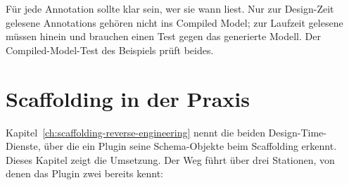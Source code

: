\begin{tip}
  Für jede Annotation sollte klar sein, wer sie wann liest. Nur zur Design-Zeit gelesene
  Annotations gehören nicht ins Compiled Model; zur Laufzeit gelesene müssen hinein und
  brauchen einen Test gegen das generierte Modell. Der Compiled-Model-Test des Beispiels
  prüft beides.
\end{tip}

\chapter{Scaffolding in der Praxis}\label{ch:scaffolding-in-practice}

Kapitel~\ref{ch:scaffolding-reverse-engineering} nennt die beiden Design-Time-Dienste, über
die ein Plugin seine Schema-Objekte beim Scaffolding erkennt. Dieses Kapitel zeigt die
Umsetzung. Der Weg führt über drei Stationen, von denen das Plugin zwei bereits kennt:

\begin{flowdiagram}
\end{flowdiagram}

